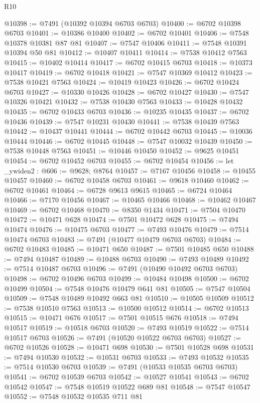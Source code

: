 \begin{lexlean}{R10}
\begin{coremodule}
@10398 := @7491 (@10392 @10394 @6703 @6703)
@10400 := @6702 @10398 @6703
@10401 := @10386 @10400
@10402 := @6702 @10401
@10406 := @7548 @10378 @10381 @87 @81
@10407 := @7547 @10406
@10411 := @7548 @10391 @10394 @50 @81
@10412 := @10407 @10411
@10414 := @7538 @10412 @7563
@10415 := @10402 @10414
@10417 := @6702 @10415 @6703
@10418 := @10373 @10417
@10419 := @6702 @10418
@10421 := @7547 @10369 @10412
@10423 := @7538 @10421 @7563
@10424 := @10419 @10423
@10426 := @6702 @10424 @6703
@10427 := @10330 @10426
@10428 := @6702 @10427
@10430 := @7547 @10326 @10421
@10432 := @7538 @10430 @7563
@10433 := @10428 @10432
@10435 := @6702 @10433 @6703
@10436 := @10235 @10435
@10437 := @6702 @10436
@10439 := @7547 @10231 @10430
@10441 := @7538 @10439 @7563
@10442 := @10437 @10441
@10444 := @6702 @10442 @6703
@10445 := @10036 @10444
@10446 := @6702 @10445
@10448 := @7547 @10032 @10439
@10450 := @7538 @10448 @7563
@10451 := @10446 @10450
@10452 := @9625 @10451
@10454 := @6702 @10452 @6703
@10455 := @6702 @10454
@10456 := let _ywiden2 : @606 := @9628; @8764
@10457 := @7167 @10456
@10458 := @10455 @10457
@10460 := @6702 @10458 @6703
@10461 := @9618 @10460
@10462 := @6702 @10461
@10464 := @6728 @9613 @9615
@10465 := @6724 @10464
@10466 := @7170 @10456
@10467 := @10465 @10466
@10468 := @10462 @10467
@10469 := @6702 @10468
@10470 := @8350 @1434
@10471 := @7504 @10470
@10472 := @10471 @628
@10474 := @7501 @10472 @628
@10475 := @7494 @10474
@10476 := @10475 @6703
@10477 := @7493 @10476
@10479 := @7514 @10474 @6703
@10483 := @7491 (@10477 @10479 @6703 @6703)
@10484 := @6702 @10483
@10485 := @10471 @650
@10487 := @7501 @10485 @650
@10488 := @7494 @10487
@10489 := @10488 @6703
@10490 := @7493 @10489
@10492 := @7514 @10487 @6703
@10496 := @7491 (@10490 @10492 @6703 @6703)
@10498 := @6702 @10496 @6703
@10499 := @10484 @10498
@10500 := @6702 @10499
@10504 := @7548 @10476 @10479 @641 @81
@10505 := @7547 @10504
@10509 := @7548 @10489 @10492 @663 @81
@10510 := @10505 @10509
@10512 := @7538 @10510 @7563
@10513 := @10500 @10512
@10514 := @6702 @10513
@10515 := @10471 @676
@10517 := @7501 @10515 @676
@10518 := @7494 @10517
@10519 := @10518 @6703
@10520 := @7493 @10519
@10522 := @7514 @10517 @6703
@10526 := @7491 (@10520 @10522 @6703 @6703)
@10527 := @6702 @10526
@10528 := @10471 @698
@10530 := @7501 @10528 @698
@10531 := @7494 @10530
@10532 := @10531 @6703
@10533 := @7493 @10532
@10535 := @7514 @10530 @6703
@10539 := @7491 (@10533 @10535 @6703 @6703)
@10541 := @6702 @10539 @6703
@10542 := @10527 @10541
@10543 := @6702 @10542
@10547 := @7548 @10519 @10522 @689 @81
@10548 := @7547 @10547
@10552 := @7548 @10532 @10535 @711 @81

\end{coremodule}
\end{lexlean}
